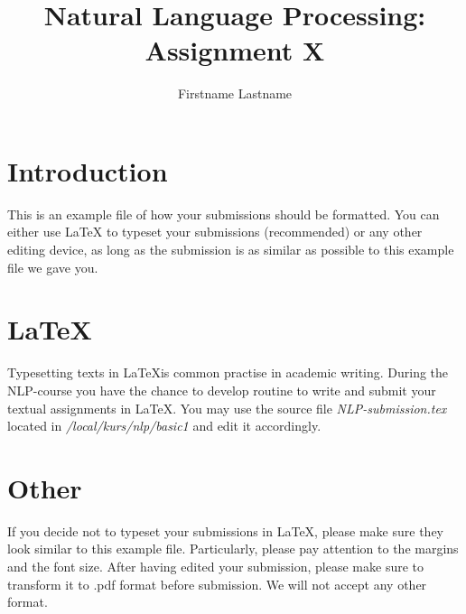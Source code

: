 \documentclass[11pt]{article} %
\title{{\LARGE Natural Language Processing: Assignment X}\\[1.5mm]} %
\author{Firstname Lastname} %
\date{} %
\begin{document}
\maketitle

\section{Introduction}
This is an example file of how your submissions should be formatted.
You can either use {\LaTeX} to typeset your submissions (recommended) or
any other editing device, as long as the submission is as similar as
possible to this example file we gave you.

\section{\LaTeX}
Typesetting texts in \LaTeX is common practise in academic
writing. During the NLP-course you have the chance to develop routine
to write and submit your textual assignments in \LaTeX. You may use
the source file \emph{NLP-submission.tex} located in
\emph{/local/kurs/nlp/basic1} and edit it accordingly.

\section{Other}
If you decide not to typeset your submissions in \LaTeX, please make
sure they look similar to this example file. Particularly, please pay
attention to the margins and the font size. After having edited your
submission, please make sure to transform it to .pdf format before
submission. We will not accept any other format.
\end{document}
